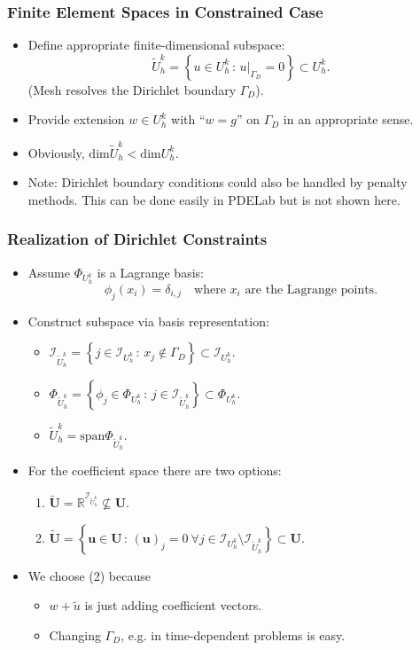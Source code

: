 \begin{frame}
\frametitle{Finite Element Spaces in Constrained Case}
\begin{itemize}
\item Define appropriate finite-dimensional subspace:
\begin{equation*}
\tilde{U}_h^k = \left \{ u \in U_h^k \,:\, u|_{\Gamma_D} = 0 \right\} \subset U_h^k.
\end{equation*}
(Mesh resolves the Dirichlet boundary $\Gamma_D$).
\item Provide extension $w\in U_h^k$ with ``$w=g$'' on $\Gamma_D$ in an appropriate sense.
\item Obviously, $\text{dim}\tilde{U}_h^k < \text{dim} U_h^k$.
\item Note: Dirichlet boundary conditions could also be handled by penalty methods. 
This can be done easily in PDELab but is not shown here. 
\end{itemize}
\end{frame}

\begin{frame}
\frametitle{Realization of Dirichlet Constraints}
\begin{itemize}
\item Assume $\Phi_{U_h^k}$ is a Lagrange basis: 
\begin{equation*}
\phi_j(x_i)=\delta_{i,j} \quad\text{where $x_i$ are the Lagrange points}.
\end{equation*}
\item Construct subspace via basis representation:
\begin{itemize}
\item $\mathcal{I}_{\tilde{U}_h^k} = \left\{ j\in \mathcal{I}_{U_h^k} \,:\, 
x_j \not\in \Gamma_D \right\} \subset \mathcal{I}_{U_h^k}$.
\item $\Phi_{\tilde{U}_h^k} = \left\{ \phi_j\in \Phi_{U_h^k} \,:\, 
j \in \mathcal{I}_{\tilde{U}_h^k} \right\} \subset \Phi_{U_h^k}$.
\item $\tilde{U}_h^k = \text{span}\Phi_{\tilde{U}_h^k}$.
\end{itemize}
\item For the coefficient space there are two options:
\begin{enumerate}
\item $\tilde{\mathbf{U}} = \mathbb{R}^{\mathcal{I}_{\tilde{U}_h^k}} \not\subseteq \mathbf{U}$.
\item $\tilde{\mathbf{U}} = \left\{ \mathbf{u}\in\mathbf{U} \,:\, (\mathbf{u})_j = 0 \  \forall
j \in \mathcal{I}_{U_h^k} \setminus \mathcal{I}_{\tilde{U}_h^k} \right\} \subset \mathbf{U}$. 
\end{enumerate}
\item We choose (2) because
\begin{itemize}
\item $w + \tilde{u}$ is just adding coefficient vectors.
\item Changing $\Gamma_D$, e.g. in time-dependent problems is easy.
\end{itemize}
\end{itemize}
\end{frame}


